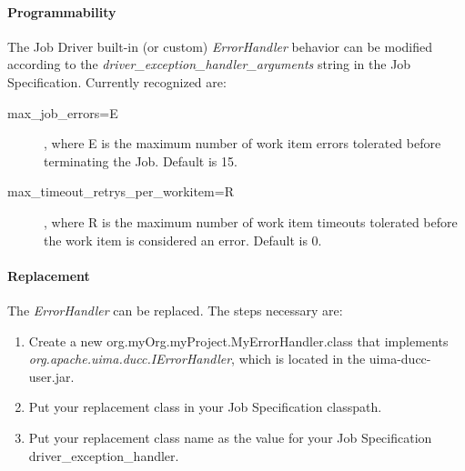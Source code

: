 \paragraph {Programmability} The Job Driver built-in (or custom) {\em ErrorHandler} behavior can be modified
according to the {\em driver\_exception\_handler\_arguments} string in the Job Specification.  
Currently recognized are:

\begin{description}
\item[max\_job\_errors=E], where E is the maximum number of work item errors tolerated before terminating the Job.  Default is 15.
\item[max\_timeout\_retrys\_per\_workitem=R], where R is the maximum number of work item timeouts tolerated before the work item is considered an error.  Default is 0.
\end{description}

\paragraph {Replacement} The {\em ErrorHandler} can be replaced.  The steps necessary are:
\begin{enumerate}
\item Create a new org.myOrg.myProject.MyErrorHandler.class that implements {\em org.apache.uima.ducc.IErrorHandler}, which is located in the uima-ducc-user.jar.
\item Put your replacement class in your Job Specification classpath.
\item Put your replacement class name as the value for your Job Specification driver\_exception\_handler.
\end{enumerate}
